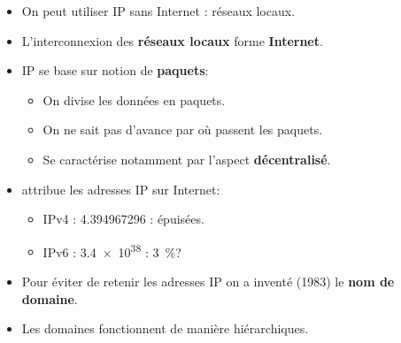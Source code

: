 \begin{frame}
	\begin{itemize}
		\item On peut utiliser IP sans Internet : réseaux locaux.
		\item L'interconnexion des \textbf{réseaux locaux} forme \textbf{Internet}.
		\item IP se base sur notion de \textbf{paquets}:
			\begin{itemize}
				\item On divise les données en paquets.
				\item On ne sait pas d'avance par où passent les paquets.
				\item Se caractérise notamment par l'aspect \textbf{décentralisé}.
			\end{itemize}
		\item {} attribue les adresses IP sur Internet:
			\begin{itemize}
				\item IPv4 : \num{4,3 94 967 296} : épuisées.
				\item IPv6 : \num{3,4e38} : \SI{3}{\percent}?
			\end{itemize}
	\end{itemize}

\end{frame}

\begin{frame}
	\begin{itemize}
		\item Pour éviter de retenir les adresses IP on a inventé (1983) le \textbf{nom de domaine}.
		\item Les domaines fonctionnent de manière hiérarchiques.
	\end{itemize}
\end{frame}

